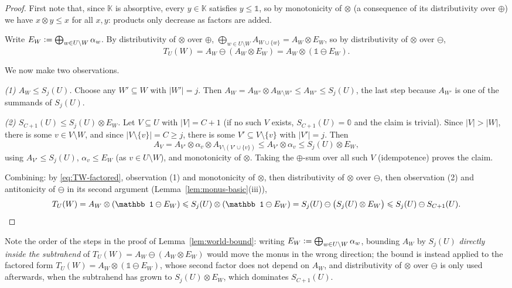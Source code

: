 \begin{toappendix}
\begin{proof}
First note that, since $\mathbb K$ is absorptive, every $y\in\mathbb K$
satisfies $y\le\mathbb 1$, so by monotonicity of $\otimes$ (a consequence
of its distributivity over $\oplus$) we have $x\otimes y\le x$ for all
$x,y$: products only decrease as factors are added.

Write $E_W\mathrel{\mathop:}=\bigoplus_{w\in U\setminus W}\alpha_w$. By distributivity
of $\otimes$ over $\oplus$,
$\bigoplus_{w\in U\setminus W}A_{W\cup\{w\}}=A_W\otimes E_W$, so by
distributivity of $\otimes$ over $\ominus$,
\begin{equation}\label{eq:TW-factored}
T_U(W)=A_W\ominus(A_W\otimes E_W)=A_W\otimes(\mathbb 1\ominus E_W).
\end{equation}

We now make two observations.

\emph{(1) $A_W\le S_j(U)$.} Choose any $W'\subseteq W$ with $|W'|=j$.
Then $A_W=A_{W'}\otimes A_{W\setminus W'}\le A_{W'}\le S_j(U)$, the last
step because $A_{W'}$ is one of the summands of $S_j(U)$.

\emph{(2) $S_{C+1}(U)\le S_j(U)\otimes E_W$.} Let $V\subseteq U$ with
$|V|=C+1$ (if no such $V$ exists, $S_{C+1}(U)=\mathbb 0$ and the claim is
trivial). Since $|V|>|W|$, there is some $v\in V\setminus W$, and since
$|V\setminus\{v\}|=C\ge j$, there is some $V'\subseteq V\setminus\{v\}$
with $|V'|=j$. Then
\[
A_V=A_{V'}\otimes\alpha_v\otimes A_{V\setminus(V'\cup\{v\})}
\le A_{V'}\otimes\alpha_v\le S_j(U)\otimes E_W,
\]
using $A_{V'}\le S_j(U)$, $\alpha_v\le E_W$ (as $v\in U\setminus W$), and
monotonicity of $\otimes$. Taking the $\oplus$-sum over all such $V$
(idempotence) proves the claim.

Combining: by \eqref{eq:TW-factored}, observation (1) and monotonicity of
$\otimes$, then distributivity of $\otimes$ over $\ominus$, then
observation (2) and antitonicity of $\ominus$ in its second argument
(Lemma~\ref{lem:monus-basic}(iii)),
\[
T_U(W)=A_W\otimes(\mathbb 1\ominus E_W)
\le S_j(U)\otimes(\mathbb 1\ominus E_W)
= S_j(U)\ominus\bigl(S_j(U)\otimes E_W\bigr)
\le S_j(U)\ominus S_{C+1}(U).\qedhere
\]
\end{proof}
Note the order of the steps in the proof of
Lemma~\ref{lem:world-bound}: writing
$E_W\mathrel{\mathop:}=\bigoplus_{w\in U\setminus W}\alpha_w$, bounding $A_W$ by
$S_j(U)$ \emph{directly inside the subtrahend} of
$T_U(W)=A_W\ominus(A_W\otimes E_W)$ would move the monus in the wrong
direction; the bound is instead applied to the factored form
$T_U(W)=A_W\otimes(\mathbb 1\ominus E_W)$, whose second factor does not
depend on $A_W$, and distributivity of $\otimes$ over $\ominus$ is only
used afterwards, when the subtrahend has grown to $S_j(U)\otimes E_W$,
which dominates $S_{C+1}(U)$.

\end{toappendix}

